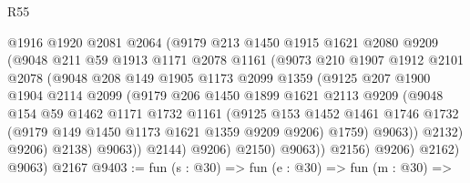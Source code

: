 \begin{lexlean}{R55}
\begin{coremodule}
                      @1916
                      @1920
                      @2081
                      @2064
                      (@9179
                        @213
                        @1450
                        @1915
                        @1621
                        @2080
                        @9209
                        (@9048
                          @211
                          @59
                          @1913
                          @1171
                          @2078
                          @1161
                          (@9073
                            @210
                            @1907
                            @1912
                            @2101
                            @2078
                            (@9048
                              @208
                              @149
                              @1905
                              @1173
                              @2099
                              @1359
                              (@9125
                                @207
                                @1900
                                @1904
                                @2114
                                @2099
                                (@9179
                                  @206
                                  @1450
                                  @1899
                                  @1621
                                  @2113
                                  @9209
                                  (@9048
                                    @154
                                    @59
                                    @1462
                                    @1171
                                    @1732
                                    @1161
                                    (@9125
                                      @153
                                      @1452
                                      @1461
                                      @1746
                                      @1732
                                      (@9179 @149 @1450 @1173 @1621 @1359 @9209 @9206)
                                      @1759)
                                    @9063))
                                @2132)
                              @9206)
                            @2138)
                          @9063))
                      @2144)
                    @9206)
                  @2150)
                @9063))
            @2156)
          @9206)
        @2162)
      @9063)
    @2167
@9403 := fun (s : @30) =>
  fun (e : @30) =>
  fun (m : @30) =>

\end{coremodule}
\end{lexlean}
